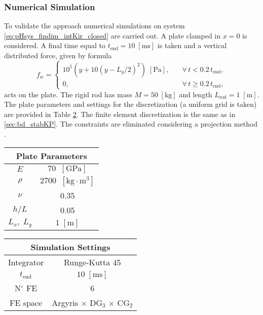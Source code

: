 \subsubsection{Numerical Simulation}
To validate the approach numerical simulations on system \eqref{eq:pHsys_findim_intKir_closed} are carried out. A  plate clamped in $x=0$ is considered. A final time equal to $t_{\text{end}} = 10 \; \mathrm{[ms]}$ is taken and a vertical distributed force, given by formula
\begin{equation}\label{eq:force_rod}
f_w = \begin{cases}
10^5 \left( y + 10 \left( y - L_y/2 \right)^2 \right) \; \mathrm{[Pa]}, \quad &\forall \, t < 0.2 \, t_{\text{end}}, \\
0, \quad &\forall \, t \ge 0.2 \, t_{\text{end}},
\end{cases}
\end{equation}
acts on the plate. The rigid rod has mass $M = 50 \; \mathrm{[kg]}$ and length $L_{\text{rod}} = 1 \; \mathrm{[m]}$. The plate parameters and settings for the discretization (a uniform grid is taken) are provided in Table \ref{tab:parKirInt}. The finite element discretization is the same as in \ref{sec:bd_stabKP}.  The constraints are eliminated considering a projection method \cite{benner2015time}.

\begin{table}[hbt]
	\centering
	\begin{tabular}{|c|c|}
		\hline 
		\multicolumn{2}{|c|}{Plate Parameters} \\ 
		\hline 
		$E$ & $70\; \; \mathrm{[GPa]}$ \\ 
		$\rho$ & $2700\; \; \mathrm{[kg \cdot m^3]}$ \\ 
		$\nu$& 0.35 \\ 
		$h/L$& 0.05 \\ 
		$L_x, \; L_y$& $1\;  \mathrm{[m]}$\\ 
		\hline 
	\end{tabular} \hspace{1cm}
	\begin{tabular}{|c|c|}
		\hline 
		\multicolumn{2}{|c|}{Simulation Settings} \\ 
		\hline 
		Integrator & Runge-Kutta 45 \\
		$t_{\text{end}}$ & $10 \; \mathrm{[ms]}$\\
		N$^\circ$ FE & 6 \\
		FE space & Argyris $\times$ DG$_3$ $\times$ CG$_2$\\
		\hline 
	\end{tabular} 
	\captionsetup{width=0.95\linewidth}
	\vspace{1mm}
	\label{tab:parKirInt}
\end{table}

